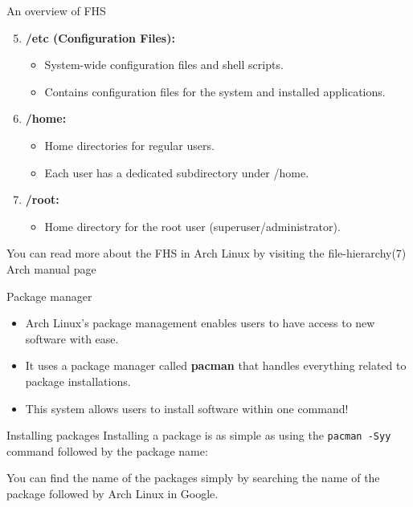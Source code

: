 \documentclass{beamer}
\begin{document}
\begin{frame}{An overview of FHS}
	\begin{enumerate}
		\setcounter{enumi}{4}
		\item \textbf{/etc (Configuration Files):} 
			\begin{itemize}
				\item System-wide configuration files and shell scripts.
				\item Contains configuration files for the system and installed applications.
			\end{itemize}
		\item \textbf{/home:} 
			\begin{itemize}
				\item Home directories for regular users.
				\item Each user has a dedicated subdirectory under /home.
			\end{itemize}
		\item \textbf{/root:}
			\begin{itemize}
				\item     Home directory for the root user (superuser/administrator).
			\end{itemize}
		\end{enumerate}
		You can read more about the FHS in Arch Linux by visiting the file-hierarchy(7) Arch manual page
\end{frame}

\begin{frame}{Package manager}
	\begin{itemize}
		\item Arch Linux's package management enables users to have access to new
	software with ease.
		\item It uses a package manager called \textbf{pacman} that
			handles everything related to package installations.
		\item This system allows users to install software within
			one command!
	\end{itemize}
\end{frame}

\begin{frame}{Installing packages}
	Installing a package is as simple as using the \texttt{pacman -Syy} command followed by the package name:
	
	You can find the name of the packages simply by searching the name
	of the package followed by Arch Linux in Google.
\end{frame}
\end{document}
